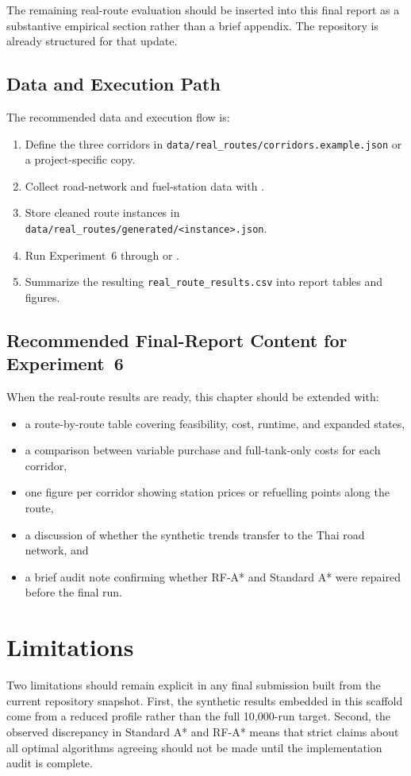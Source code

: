 The remaining real-route evaluation should be inserted into this final report as a substantive
empirical section rather than a brief appendix.
The repository is already structured for that update.

\subsection*{Data and Execution Path}

The recommended data and execution flow is:
\begin{enumerate}
    \item Define the three corridors in \texttt{data/real\_routes/corridors.example.json} or a project-specific copy.
    \item Collect road-network and fuel-station data with .
    \item Store cleaned route instances in \texttt{data/real\_routes/generated/<instance>.json}.
    \item Run Experiment~6 through  or .
    \item Summarize the resulting \texttt{real\_route\_results.csv} into report tables and figures.
\end{enumerate}

\subsection*{Recommended Final-Report Content for Experiment~6}

When the real-route results are ready, this chapter should be extended with:
\begin{itemize}
    \item a route-by-route table covering feasibility, cost, runtime, and expanded states,
    \item a comparison between variable purchase and full-tank-only costs for each corridor,
    \item one figure per corridor showing station prices or refuelling points along the route,
    \item a discussion of whether the synthetic trends transfer to the Thai road network, and
    \item a brief audit note confirming whether RF-A* and Standard A* were repaired before the final run.
\end{itemize}

\section{Limitations}

Two limitations should remain explicit in any final submission built from the current
repository snapshot.
First, the synthetic results embedded in this scaffold come from a reduced profile rather than
the full 10,000-run target.
Second, the observed discrepancy in Standard A* and RF-A* means that strict claims about all
optimal algorithms agreeing should not be made until the implementation audit is complete.
